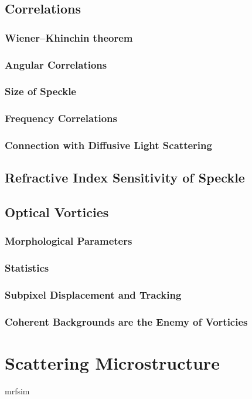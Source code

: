 \documentclass[a4paper,titlepage,onecolumn]{report}
\begin{document}
 \section{Correlations}
  \subsection{Wiener–Khinchin theorem}
  \subsection{Angular Correlations}
  \subsection{Size of Speckle}
  \subsection{Frequency Correlations}
  \subsection{Connection with Diffusive Light Scattering}
 \section{Refractive Index Sensitivity of Speckle}
 \section{Optical Vorticies}
  \subsection{Morphological Parameters}
  \subsection{Statistics}
  \subsection{Subpixel Displacement and Tracking}
  \subsection{Coherent Backgrounds are the Enemy of Vorticies}

\chapter{Scattering Microstructure} \label{ch:scattmicro}
{mrfsim}
\end{document}
